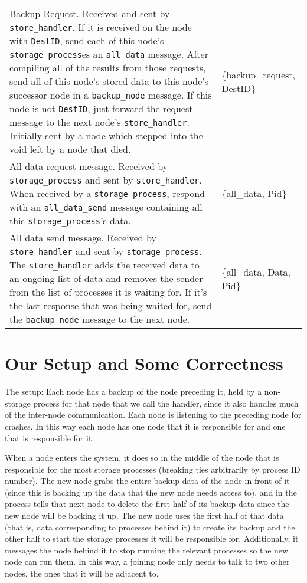 \documentclass[12pt,letterpaper]{article}
\renewcommand{\tt}[1]{\texttt{#1}}
\newcommand{\sh}{\tt{store\_handler}}
\renewcommand{\sp}{\tt{storage\_process}}
\begin{document}
\begin{longtable}{p{4.5in}T}
Backup Request.  Received and sent by \sh.  If it is received on the node with \tt{DestID}, send each of this node's \sp es an \tt{all\_data} message.  After compiling all of the results from those requests, send all of this node's stored data to this node's successor node in a \tt{backup\_node} message.  If this node is not \tt{DestID}, just forward the request message to the next node's \sh. Initially sent by a node which stepped into the void left by a node that died.  & 
\{backup\_request, DestID\} \\

All data request message.  Received by \sp{} and sent by \sh.  When received by a \sp, respond with an \tt{all\_data\_send} message containing all this \sp's data.  & 
\{all\_data, Pid\} \\

All data send message.  Received by \sh{} and sent by \sp.  The \sh{} adds the received data to an ongoing list of data and removes the sender from the list of processes it is waiting for. If it's the last response that was being waited for, send the \tt{backup\_node} message to the next node. & 
\{all\_data, Data, Pid\}

\end{longtable}

\clearpage
\onehalfspacing

\section*{Our Setup and Some Correctness}
The setup:
Each node has a backup of the node preceding it, held by a non-storage process for that node that we call the handler, since it also handles much of the inter-node communication. Each node is listening to the preceding node for crashes. In this way each node has one node that it is responsible for and one that is responsible for it.

When a node enters the system, it does so in the middle of the node that is responsible for the most storage processes (breaking ties arbitrarily by process ID number). The new node grabs the entire backup data of the node in front of it (since this is backing up the data that the new node needs access to), and in the process tells that next node to delete the first half of its backup data since the new node will be backing it up. The new node uses the first half of that data (that is, data corresponding to processes behind it) to create its backup and the other half to start the storage processes it will be responsible for. Additionally, it messages the node behind it to stop running the relevant processes so the new node can run them. In this way, a joining node only needs to talk to two other nodes, the ones that it will be adjacent to. 
\end{document}
